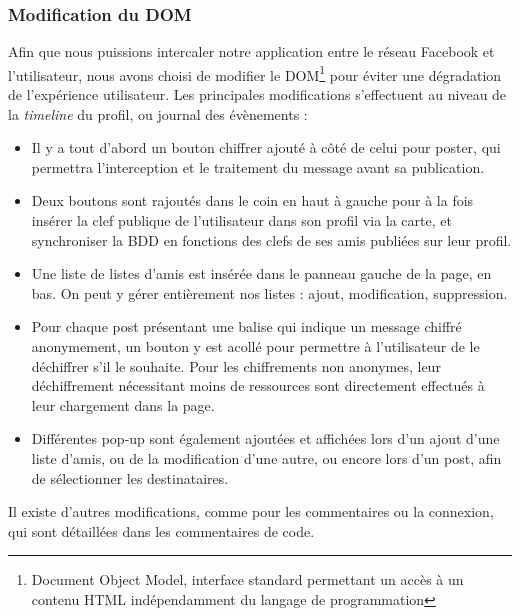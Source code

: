 \documentclass[a4paper,11pt,french]{article}
\begin{document}
\subsubsection{Modification du DOM}
Afin que nous puissions intercaler notre application entre le réseau Facebook et 
l'utilisateur, nous avons choisi de modifier le DOM\footnote{Document Object Model,
interface standard permettant un accès à un contenu HTML indépendamment du langage
de programmation} pour éviter une dégradation de l'expérience utilisateur. Les
principales modifications s'effectuent au niveau de la \emph{timeline} du profil,
ou journal des évènements :
\begin{itemize}
\item Il y a tout d'abord un bouton chiffrer ajouté à côté
de celui pour poster, qui permettra l'interception et le traitement du message
avant sa publication.
\item Deux boutons sont rajoutés dans le coin en haut à gauche pour à la fois
insérer la clef publique de l'utilisateur dans son profil via la carte, et 
synchroniser la BDD en fonctions des clefs de ses amis publiées sur leur profil.
\item Une liste de listes d'amis est insérée dans le panneau gauche de la page, 
en bas. On peut y gérer entièrement nos listes : ajout, modification, suppression.
\item Pour chaque post présentant une balise qui indique un message chiffré 
anonymement, un bouton y est acollé pour permettre à l'utilisateur de le déchiffrer
s'il le souhaite. Pour les chiffrements non anonymes, leur déchiffrement nécessitant
moins de ressources sont directement effectués à leur chargement dans la page.
\item Différentes pop-up sont également ajoutées et affichées lors d'un ajout d'une
liste d'amis, ou de la modification d'une autre, ou encore lors d'un post, afin
de sélectionner les destinataires.
\end{itemize}
Il existe d'autres modifications, comme pour les commentaires ou la connexion,
qui sont détaillées dans les commentaires de code.
\end{document}

